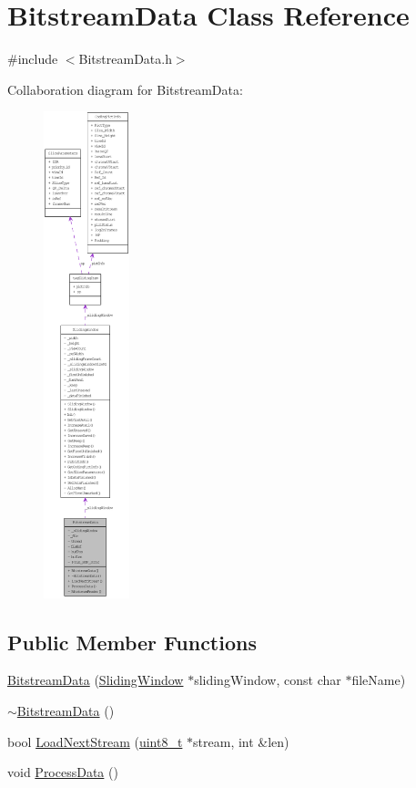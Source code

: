 \hypertarget{class_bitstream_data}{
\section{BitstreamData Class Reference}
\label{class_bitstream_data}
}


{\ttfamily \#include $<$BitstreamData.h$>$}



Collaboration diagram for BitstreamData:\nopagebreak
\begin{figure}[H]
\begin{center}
\leavevmode
\includegraphics[height=400pt]{class_bitstream_data__coll__graph}
\end{center}
\end{figure}
\subsection*{Public Member Functions}
\begin{DoxyCompactItemize}
\item 
\hyperlink{class_bitstream_data_a0a84eec74369ca5b7754250b683aaaaa}{BitstreamData} (\hyperlink{class_sliding_window}{SlidingWindow} $\ast$slidingWindow, const char $\ast$fileName)
\item 
\hyperlink{class_bitstream_data_a508c273c706e9ab418307d688f743b74}{$\sim$BitstreamData} ()
\item 
bool \hyperlink{class_bitstream_data_a9475d45cccc6018ece6dec99caad1e58}{LoadNextStream} (\hyperlink{_types_8h_a363e4d606232036a6b89060813c45489}{uint8\_\-t} $\ast$stream, int \&len)
\item 
void \hyperlink{class_bitstream_data_a3832355fc8add0ba405771f0276bddf5}{ProcessData} ()
\end{DoxyCompactItemize}


